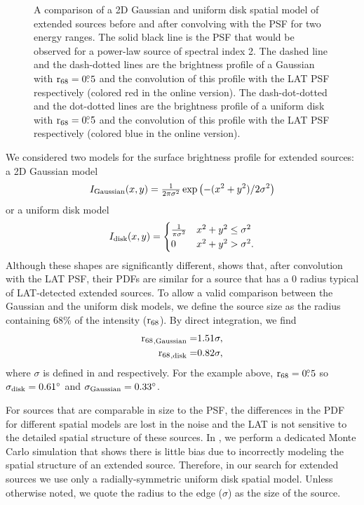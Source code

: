 \begin{figure}[htbp]
    \fi
    \caption{
    A comparison of a 2D Gaussian and uniform disk spatial model
    of extended sources before and after convolving with the PSF for two
    energy ranges.  The solid black line is the PSF that would be observed
    for a power-law source of spectral index 2. The dashed line
    and the dash-dotted lines are 
    the brightness profile of a Gaussian with ${\mathrm{r}_{68}}=0\mbox{$.\!\!^\circ$}5$
    and the convolution of this profile with the LAT PSF respectively
    (colored red in the online version).
    The dash-dot-dotted and the dot-dotted lines are the brightness profile
    of a uniform disk with ${\mathrm{r}_{68}}=0\mbox{$.\!\!^\circ$}5$ and the convolution
    of this profile with the LAT PSF respectively (colored blue in the online version).
    }
  \end{figure}


We considered two models for the
surface brightness profile for extended sources: a 2D Gaussian model
\begin{equation}\eqnlabel{gauss_pdf}
  I_\text{Gaussian}(x,y)=\tfrac{1}{2\pi\sigma^2}\exp\left(-(x^2+y^2)/2\sigma^2\right)
\end{equation}
or a uniform disk model
\begin{equation}\eqnlabel{disk_pdf}
  I_\text{disk}(x,y)=
  \begin{cases}
    \frac{1}{\pi\sigma^2} & x^2+y^2\le\sigma^2 \\
    0                      & x^2+y^2>\sigma^2.
  \end{cases}
\end{equation}
Although these shapes are significantly different,
 shows that, after convolution with the
LAT PSF, their PDFs are similar for a source that has a 0 radius
typical of LAT-detected extended sources.  To allow a valid comparison
between the Gaussian and the uniform disk models,
we define the source size as the radius containing 68\% of the
intensity (${\mathrm{r}_{68}}$). 
By direct integration, we find
\begin{align}
{\ensuremath{\mathrm{r}_{68}}}_\text{,Gaussian}=&1.51\sigma, \\
{\mathrm{r}_{68}}_\text{,disk}=&0.82\sigma, 
\end{align}
where $\sigma$ is defined
in  and  respectively.
For the example above, ${\mathrm{r}_{68}}=0\mbox{$.\!\!^\circ$}5$ so $\sigma_\text{disk}=0.61^\circ$
and $\sigma_\text{Gaussian}=0.33^\circ$.

For sources that are comparable in size to the PSF,
the differences in the PDF for
different spatial models are lost in the noise and the LAT is not sensitive
to the detailed spatial structure of these sources.  
In , we perform a dedicated Monte Carlo simulation
that shows there is little bias due to incorrectly modeling the spatial structure
of an extended source.
Therefore, in our search for extended sources we use only a radially-symmetric uniform
disk spatial model. Unless otherwise noted,
we quote the radius to the edge ($\sigma$) as the size of the source.

